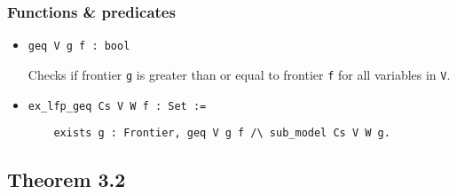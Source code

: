 \documentclass[slides]{beamer}
\begin{document}
\begin{frame}[fragile]
    \frametitle{Functions \& predicates}

    \begin{itemize}
        \item \begin{minipage}{\linewidth}\lstinline{geq V g f : bool}\end{minipage}
            Checks if frontier \lstinline{g} is greater than or equal to frontier \lstinline{f} for all variables in \lstinline{V}.
        \item \begin{minipage}{\linewidth}\lstinline{ex_lfp_geq Cs V W f : Set :=}\end{minipage}
              \begin{minipage}{\linewidth}\lstinline{    exists g : Frontier, geq V g f /\ sub_model Cs V W g.}\end{minipage}
    \end{itemize}
\end{frame}

\subsection{Theorem 3.2}
\end{document}
